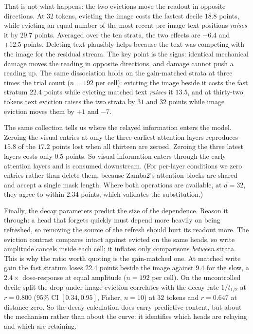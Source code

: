 \documentclass{article}
\begin{document}
That is not what happens: the two evictions move the readout in opposite
directions. At 32 tokens, evicting the image costs the fastest decile $18.8$
points, while evicting an equal number of the most recent pre-image text
positions \emph{raises} it by $29.7$ points. Averaged over the ten strata,
the two effects are $-6.4$ and $+12.5$ points. Deleting text plausibly helps
because the text was competing with the image for the residual stream. The
key point is the signs: identical mechanical damage moves the reading in
opposite directions, and damage cannot push a reading up. The same dissociation holds on the gain-matched strata at three times
the trial count ($n = 192$ per cell): evicting the image beside it costs the
fast stratum $22.4$ points while evicting matched text \emph{raises} it
$13.5$, and at thirty-two tokens text eviction raises the two strata by $31$
and $32$ points while image eviction moves them by $+1$ and $-7$.

The same collection tells us where the relayed information enters the model.
Zeroing the visual entries at only the three earliest attention layers
reproduces $15.8$ of the $17.2$ points lost when all thirteen are zeroed.
Zeroing the three latest layers costs only $0.5$ points. So visual information
enters through the early attention layers and is consumed downstream. (For
per-layer conditions we zero entries rather than delete them, because Zamba2's
attention blocks are shared and accept a single mask length. Where both
operations are available, at $d{=}32$, they agree to within $2.34$ points,
which validates the substitution.)

Finally, the decay parameters predict the size of the dependence. Reason it
through: a head that forgets quickly must depend more heavily on being
refreshed, so removing the source of the refresh should hurt its readout more.
The eviction contrast compares intact against evicted on the same heads, so
write amplitude cancels inside each cell; it inflates only comparisons
\emph{between} strata. This is why the ratio worth quoting is the gain-matched
one. At matched write gain the fast stratum loses $22.4$ points beside the
image against $9.4$ for the slow, a $2.4\times$ dose-response at equal
amplitude ($n = 192$ per cell). On the uncontrolled decile split the drop
under image eviction correlates with the decay rate $1/t_{1/2}$ at $r = 0.800$
($95\%$ CI $[0.34, 0.95]$, Fisher, $n = 10$) at $32$ tokens and $r = 0.647$ at
distance zero. So the decay calculation does carry predictive content, but
about the mechanism rather than about the curve: it identifies which heads are
relaying and which are retaining.
\end{document}
